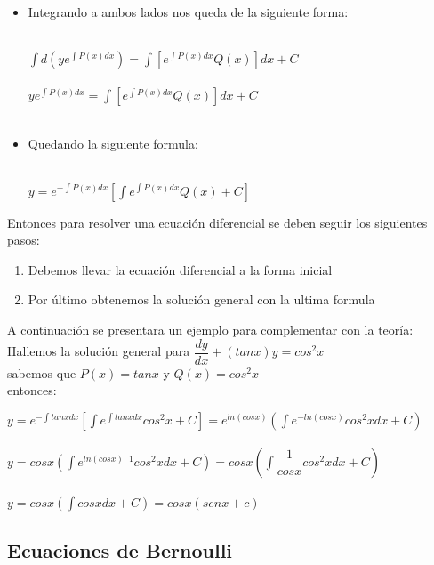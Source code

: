 \documentclass[10pt,a4paper]{article}
\begin{document}
\begin{itemize}
 \item Integrando a ambos lados nos queda de la siguiente forma:\\
 \,\\
 \begin{center}
 $\int d(ye^{\int P(x)dx})=\int [e^{\int P(x)dx}Q(x)]dx+C$\\
 \,\\
 $ye^{\int P(x)dx}=\int [e^{\int P(x)dx}Q(x)]dx+C$\\
 \,\\
 \end{center}
 \item Quedando la siguiente formula:\\
 \,\\
 \begin{center}
 $y=e^{-\int P(x)dx}[\int e^{\int P(x)dx}Q(x)+C]$
 \end{center}
\end{itemize}

Entonces para resolver una ecuación diferencial se deben seguir los siguientes pasos:\\
\begin{enumerate}
\item Debemos llevar la ecuación diferencial a la forma inicial
\item Por último obtenemos la solución general con la ultima formula
\end{enumerate}

A continuación se presentara un ejemplo para complementar con la teoría:\\
Hallemos la solución general para $\dfrac{dy}{dx}+(tanx)y=cos^2x$\\

sabemos que $P(x)=tanx$ y $Q(x)=cos^2x$\\
entonces:\\
\begin{center}
$y=e^{-\int tanxdx}[\int e^{\int tanxdx}cos^2x+C]$$=e^{ln(cosx)}(\int e^{-ln(cosx)}cos^2xdx+C)$\\
\,\\
$y=cosx(\int e^{ln(cosx)^-1}cos^2xdx+C)$$=cosx(\int\dfrac{1}{cosx}cos^2xdx+C)$\\
\,\\
$y=cosx(\int{cosxdx}+C)$$=cosx(senx+c)$

\end{center}
  
  \subsection{Ecuaciones de Bernoulli}
  
\end{document}
